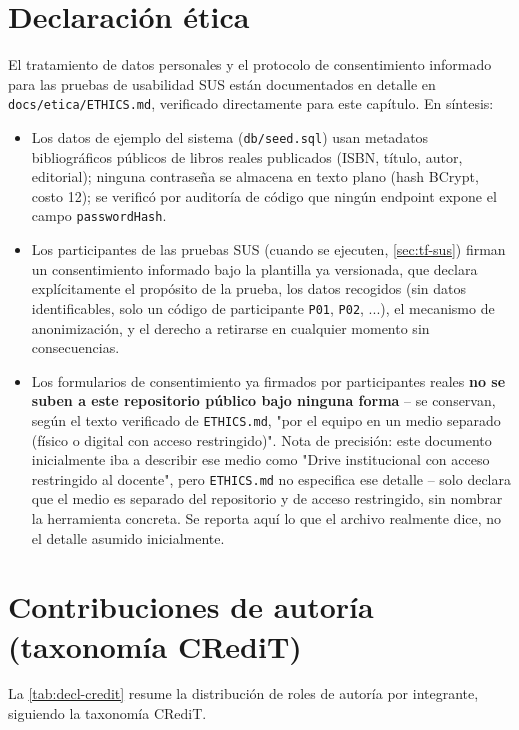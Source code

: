 \section{Declaración ética}
\label{sec:decl-etica}

El tratamiento de datos personales y el protocolo de consentimiento
informado para las pruebas de usabilidad SUS están documentados en
detalle en \texttt{docs/etica/ETHICS.md}, verificado directamente para
este capítulo. En síntesis:

\begin{itemize}[leftmargin=1.2cm]
  \item Los datos de ejemplo del sistema (\texttt{db/seed.sql}) usan
    metadatos bibliográficos públicos de libros reales publicados (ISBN,
    título, autor, editorial); ninguna contraseña se almacena en texto
    plano (hash BCrypt, costo 12); se verificó por auditoría de código
    que ningún endpoint expone el campo \texttt{passwordHash}.
  \item Los participantes de las pruebas SUS (cuando se ejecuten,
    \autoref{sec:tf-sus}) firman un consentimiento informado bajo la
    plantilla ya versionada, que declara explícitamente el propósito de
    la prueba, los datos recogidos (sin datos identificables, solo un
    código de participante \texttt{P01}, \texttt{P02}, ...), el
    mecanismo de anonimización, y el derecho a retirarse en cualquier
    momento sin consecuencias.
  \item Los formularios de consentimiento ya firmados por participantes
    reales \textbf{no se suben a este repositorio público bajo ninguna
    forma} -- se conservan, según el texto verificado de
    \texttt{ETHICS.md}, "por el equipo en un medio separado (físico o
    digital con acceso restringido)". Nota de precisión: este documento
    inicialmente iba a describir ese medio como "Drive institucional con
    acceso restringido al docente", pero \texttt{ETHICS.md} no especifica
    ese detalle -- solo declara que el medio es separado del repositorio
    y de acceso restringido, sin nombrar la herramienta concreta. Se
    reporta aquí lo que el archivo realmente dice, no el detalle asumido
    inicialmente.
\end{itemize}

\section{Contribuciones de autoría (taxonomía CRediT)}

La \autoref{tab:decl-credit} resume la distribución de roles de
autoría por integrante, siguiendo la taxonomía CRediT.

